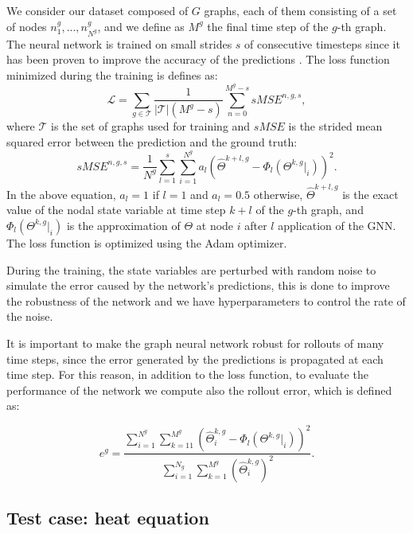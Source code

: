 \documentclass[11pt,a4paper]{article}
\begin{document}
We consider our dataset composed of \(G\) graphs, each of them consisting of a set of nodes \(n_1^g,...,n_{N^g}^g\), and we define as \(M^g\) the final time step of the \(g\)-th graph.
The neural network is trained on small strides \(s\) of consecutive timesteps since it has been proven to improve the accuracy of the predictions \cite{Luca}.
The loss function minimized during the training is defines as:
\begin{equation}
    \mathcal{L} = \sum_{g \in \mathcal{T}} \frac{1}{|\mathcal{T}|(M^g-s)} \sum_{n=0}^{M^g-s} sMSE^{n,g,s},
\end{equation}
where \(\mathcal{T}\) is the set of graphs used for training and \(sMSE\) is the strided mean squared error between the prediction and the ground truth:
\begin{equation}
    sMSE^{n,g,s} = \frac{1}{N^g} \sum_{l=1}^{s} \sum_{i=1}^{N^g} a_l (\hat{\Theta}^{k+l,g} - \Phi_l(\Theta^{k,g}|_i))^2.
    \label{mse}
\end{equation}
In the above equation, \(a_l=1\) if \(l=1\) and \(a_l=0.5\) otherwise, \(\hat{\Theta}^{k+l,g}\) is the exact value of the nodal state variable at time step \(k+l\) of the \(g\)-th graph, and \(\Phi_l(\Theta^{k,g}|_i)\) is the approximation of \(\Theta\) at node \(i\) after \(l\) application of the GNN. 
The loss function is optimized using the Adam optimizer.

During the training, the state variables are perturbed with random noise to simulate the error caused by the network's predictions, this is done to improve the robustness of the network and we have hyperparameters to control the rate of the noise. 

It is important to make the graph neural network robust for rollouts of many time steps, since the error generated by the predictions is propagated at each time step. 
For this reason, in addition to the loss function, to evaluate the performance of the network we compute also the rollout error, which is defined as: 

\begin{equation}
    e^g = \frac{ \sum_{i=1}^{N^g} \sum_{k=11}^{M^g} (\hat{\Theta}_i^{k,g} -  \Phi_l(\Theta^{k,g}|_i))^2 }{ \sum_{i=1}^{N_g} \sum_{k=1}^{M^g} (\hat{\Theta}_i^{k,g})^2 }.
    \label{rollout}
\end{equation}


\subsection{Test case: heat equation}
\label{testcase}
\end{document}
